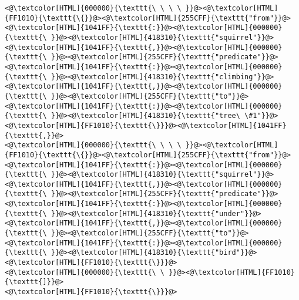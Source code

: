 \begin{lstlisting}
<@\textcolor[HTML]{000000}{\texttt{\ \ \ \ }}@><@\textcolor[HTML]{FF1010}{\texttt{\{}}@><@\textcolor[HTML]{255CFF}{\texttt{"from"}}@><@\textcolor[HTML]{1041FF}{\texttt{:}}@><@\textcolor[HTML]{000000}{\texttt{\ }}@><@\textcolor[HTML]{418310}{\texttt{"squirrel"}}@><@\textcolor[HTML]{1041FF}{\texttt{,}}@><@\textcolor[HTML]{000000}{\texttt{\ }}@><@\textcolor[HTML]{255CFF}{\texttt{"predicate"}}@><@\textcolor[HTML]{1041FF}{\texttt{:}}@><@\textcolor[HTML]{000000}{\texttt{\ }}@><@\textcolor[HTML]{418310}{\texttt{"climbing"}}@><@\textcolor[HTML]{1041FF}{\texttt{,}}@><@\textcolor[HTML]{000000}{\texttt{\ }}@><@\textcolor[HTML]{255CFF}{\texttt{"to"}}@><@\textcolor[HTML]{1041FF}{\texttt{:}}@><@\textcolor[HTML]{000000}{\texttt{\ }}@><@\textcolor[HTML]{418310}{\texttt{"tree\ \#1"}}@><@\textcolor[HTML]{FF1010}{\texttt{\}}}@><@\textcolor[HTML]{1041FF}{\texttt{,}}@>
<@\textcolor[HTML]{000000}{\texttt{\ \ \ \ }}@><@\textcolor[HTML]{FF1010}{\texttt{\{}}@><@\textcolor[HTML]{255CFF}{\texttt{"from"}}@><@\textcolor[HTML]{1041FF}{\texttt{:}}@><@\textcolor[HTML]{000000}{\texttt{\ }}@><@\textcolor[HTML]{418310}{\texttt{"squirrel"}}@><@\textcolor[HTML]{1041FF}{\texttt{,}}@><@\textcolor[HTML]{000000}{\texttt{\ }}@><@\textcolor[HTML]{255CFF}{\texttt{"predicate"}}@><@\textcolor[HTML]{1041FF}{\texttt{:}}@><@\textcolor[HTML]{000000}{\texttt{\ }}@><@\textcolor[HTML]{418310}{\texttt{"under"}}@><@\textcolor[HTML]{1041FF}{\texttt{,}}@><@\textcolor[HTML]{000000}{\texttt{\ }}@><@\textcolor[HTML]{255CFF}{\texttt{"to"}}@><@\textcolor[HTML]{1041FF}{\texttt{:}}@><@\textcolor[HTML]{000000}{\texttt{\ }}@><@\textcolor[HTML]{418310}{\texttt{"bird"}}@><@\textcolor[HTML]{FF1010}{\texttt{\}}}@>
<@\textcolor[HTML]{000000}{\texttt{\ \ }}@><@\textcolor[HTML]{FF1010}{\texttt{]}}@>
<@\textcolor[HTML]{FF1010}{\texttt{\}}}@>

\end{lstlisting}
